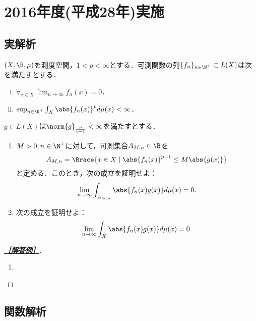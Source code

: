 \documentclass[uplatex,dvipdfmx]{jsarticle}
\begin{document}
\section{2016年度(平成28年)実施}

\subsection{実解析}

\begin{tcolorbox}[colframe=ForestGreen, colback=ForestGreen!10!white,breakable,colbacktitle=ForestGreen!40!white,coltitle=black,fonttitle=\bfseries\sffamily,
    title=B 第9問（実解析）]
    $(X,\B,\mu)$を測度空間，$1<p<\infty$とする．可測関数の列$\{f_n\}_{n\in\N^+}\subset L(X)$は次を満たすとする．
    \begin{enumerate}[(i)]
        \item $\forall_{x\in X}\;\lim_{n\to\infty}f_n(x)=0$．
        \item $\sup_{n\in\N^+}\int_X\abs{f_n(x)}^pd\mu(x)<\infty$．
    \end{enumerate}
    $g\in L(X)$は$\norm{g}_{\frac{p}{p-1}}<\infty$を満たすとする．
    \begin{enumerate}
        \item $M>0,n\in\N^+$に対して，可測集合$A_{M,n}\in\B$を
        \[A_{M,n}=\Brace{x\in X\mid\abs{f_n(x)}^{p-1}\le M\abs{g(x)}}\]
        と定める．このとき，次の成立を証明せよ：
        \[\lim_{n\to\infty}\int_{A_{M,n}}\abs{f_n(x)g(x)}d\mu(x)=0.\]
        \item 次の成立を証明せよ：
        \[\lim_{n\to\infty}\int_X\abs{f_n(x)g(x)}d\mu(x)=0.
        \]
    \end{enumerate}
\end{tcolorbox}
\begin{proof}[\textbf{\underline{［解答例］}}]\mbox{}
    \begin{enumerate}
        \item 
    \end{enumerate}
\end{proof}

\subsection{関数解析}
\end{document}
